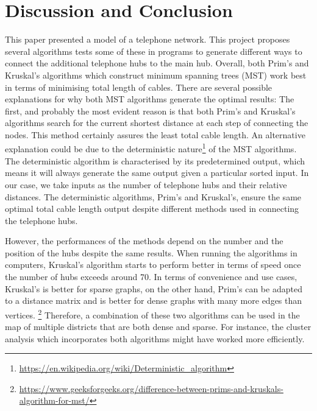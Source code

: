 \documentclass[twocolumn]{article}
\begin{document}


\section{Discussion and Conclusion}\label{Discussion}
This paper presented a model of a telephone network. This project proposes several algorithms tests some of these in programs to generate different ways to connect the additional telephone hubs to the main hub. Overall, both Prim’s and Kruskal’s algorithms which construct minimum spanning trees (MST) work best in terms of minimising total length of cables. There are several possible explanations for why both MST algorithms generate the optimal results:
The first, and probably the most evident reason is that both Prim’s and Kruskal’s algorithms search for the current shortest distance at each step of connecting the nodes. This method certainly assures the least total cable length.
An alternative explanation could be due to the deterministic nature\footnote{\url{https://en.wikipedia.org/wiki/Deterministic_algorithm}} of the MST algorithms. The deterministic algorithm is characterised by its predetermined output, which means it will always generate the same output given a particular sorted input. In our case, we take inputs as the number of telephone hubs and their relative distances. The deterministic algorithms, Prim's and Kruskal's, ensure the same optimal total cable length output despite different methods used in connecting the telephone hubs.
 
However, the performances of the methods depend on the number and the position of the hubs despite the same results. When running the algorithms in computers, Kruskal's algorithm starts to perform better in terms of speed once the number of hubs exceeds around 70. In terms of convenience and use cases, Kruskal's is better for sparse graphs, on the other hand, Prim's can be adapted to a distance matrix and is better for dense graphs with many more edges than vertices. \footnote{\url{https://www.geeksforgeeks.org/difference-between-prims-and-kruskals-algorithm-for-mst/}} Therefore, a combination of these two algorithms can be used in the map of multiple districts that are both dense and sparse. For instance, the cluster analysis which incorporates both algorithms might have worked more efficiently.
 
\end{document}
